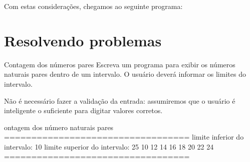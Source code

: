 \documentclass[11pt,fleqn]{practice}
\begin{document}
Com estas considerações, chegamos ao seguinte programa:


\pagebreak
\section{Resolvendo problemas}

\begin{task}[breakable]{Contagem dos números pares}{}
  Escreva um programa para exibir os números naturais pares dentro de um
  intervalo. O usuário deverá informar os limites do intervalo.

  Não é necessário fazer a validação da entrada: assumiremos que o
  usuário é inteligente o suficiente para digitar valores corretos.

  \begin{runexample}
ontagem dos número naturais pares
==================================
limite inferior do intervalo: 10
limite superior do intervalo: 25
10 12 14 16 18 20 22 24 
==================================
  \end{runexample}

  \tcblower
  \solution
\end{task}
\end{document}

